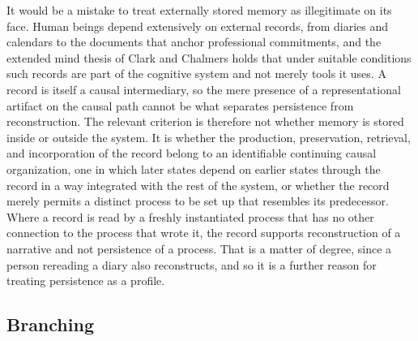 \documentclass[12pt]{article}
\theoremstyle{definition}
\theoremstyle{plain}
\begin{document}
It would be a mistake to treat externally stored memory as illegitimate on its face. Human beings depend extensively on external records, from diaries and calendars to the documents that anchor professional commitments, and the extended mind thesis of Clark and Chalmers \cite{clark1998} holds that under suitable conditions such records are part of the cognitive system and not merely tools it uses. A record is itself a causal intermediary, so the mere presence of a representational artifact on the causal path cannot be what separates persistence from reconstruction. The relevant criterion is therefore not whether memory is stored inside or outside the system. It is whether the production, preservation, retrieval, and incorporation of the record belong to an identifiable continuing causal organization, one in which later states depend on earlier states through the record in a way integrated with the rest of the system, or whether the record merely permits a distinct process to be set up that resembles its predecessor. Where a record is read by a freshly instantiated process that has no other connection to the process that wrote it, the record supports reconstruction of a narrative and not persistence of a process. That is a matter of degree, since a person rereading a diary also reconstructs, and so it is a further reason for treating persistence as a profile.

\subsection{Branching}
\end{document}
